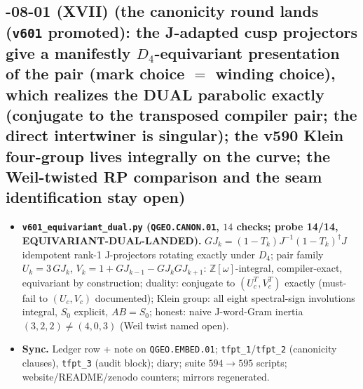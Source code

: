\documentclass[11pt]{article}
\begin{document}
\subsection*{-08-01 (XVII) (the canonicity round lands (\texttt{v601} promoted): the J-adapted cusp projectors give a manifestly $D_4$-equivariant presentation of the pair (mark choice $=$ winding choice), which realizes the DUAL parabolic exactly (conjugate to the transposed compiler pair; the direct intertwiner is singular); the v590 Klein four-group lives integrally on the curve; the Weil-twisted RP comparison and the seam identification stay open)}
\begin{itemize}[leftmargin=1.5em]
\item \textbf{\texttt{v601\_equivariant\_dual.py} (\texttt{QGEO.CANON.01}, $14$ checks; probe
14/14, EQUIVARIANT-DUAL-LANDED).} $GJ_k=(1-T_k)J^{-1}(1-T_k)^\dagger J$ idempotent rank-1
J-projectors rotating exactly under $D_4$; pair family $U_k=3\,GJ_k$,
$V_k=1+GJ_{k-1}-GJ_kGJ_{k+1}$: $\mathbb{Z}[\omega]$-integral, compiler-exact, equivariant by
construction; duality: conjugate to $(U_c^T,V_c^T)$ exactly (must-fail to $(U_c,V_c)$
documented); Klein group: all eight spectral-sign involutions integral, $S_0$ explicit,
$AB=S_0$; honest: naive J-word-Gram inertia $(3,2,2)\ne(4,0,3)$ (Weil twist named open).
\item \textbf{Sync.} Ledger row + note on \texttt{QGEO.EMBED.01}; \texttt{tfpt\_1}/\texttt{tfpt\_2}
(canonicity clauses), \texttt{tfpt\_3} (audit block); diary; suite $594\to595$ scripts;
website/README/zenodo counters; mirrors regenerated.
\end{itemize}
\end{document}
